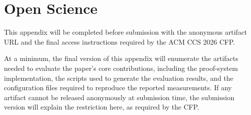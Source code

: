\section{Open Science}

This appendix will be completed before submission with the anonymous artifact
URL and the final access instructions required by the ACM CCS 2026 CFP.

At a minimum, the final version of this appendix will enumerate the artifacts
needed to evaluate the paper's core contributions, including the proof-system
implementation, the scripts used to generate the evaluation results, and the
configuration files required to reproduce the reported measurements. If any
artifact cannot be released anonymously at submission time, the submission
version will explain the restriction here, as required by the CFP.

